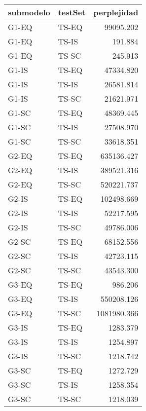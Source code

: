 \begin{tabular}{llr}
\toprule
submodelo & testSet &  perplejidad \\
\midrule
    G1-EQ &   TS-EQ &    99095.202 \\
    G1-EQ &   TS-IS &      191.884 \\
    G1-EQ &   TS-SC &      245.913 \\
    G1-IS &   TS-EQ &    47334.820 \\
    G1-IS &   TS-IS &    26581.814 \\
    G1-IS &   TS-SC &    21621.971 \\
    G1-SC &   TS-EQ &    48369.445 \\
    G1-SC &   TS-IS &    27508.970 \\
    G1-SC &   TS-SC &    33618.351 \\
    G2-EQ &   TS-EQ &   635136.427 \\
    G2-EQ &   TS-IS &   389521.316 \\
    G2-EQ &   TS-SC &   520221.737 \\
    G2-IS &   TS-EQ &   102498.669 \\
    G2-IS &   TS-IS &    52217.595 \\
    G2-IS &   TS-SC &    49786.006 \\
    G2-SC &   TS-EQ &    68152.556 \\
    G2-SC &   TS-IS &    42723.115 \\
    G2-SC &   TS-SC &    43543.300 \\
    G3-EQ &   TS-EQ &      986.206 \\
    G3-EQ &   TS-IS &   550208.126 \\
    G3-EQ &   TS-SC &  1081980.366 \\
    G3-IS &   TS-EQ &     1283.379 \\
    G3-IS &   TS-IS &     1254.897 \\
    G3-IS &   TS-SC &     1218.742 \\
    G3-SC &   TS-EQ &     1272.729 \\
    G3-SC &   TS-IS &     1258.354 \\
    G3-SC &   TS-SC &     1218.039 \\
\bottomrule
\end{tabular}
